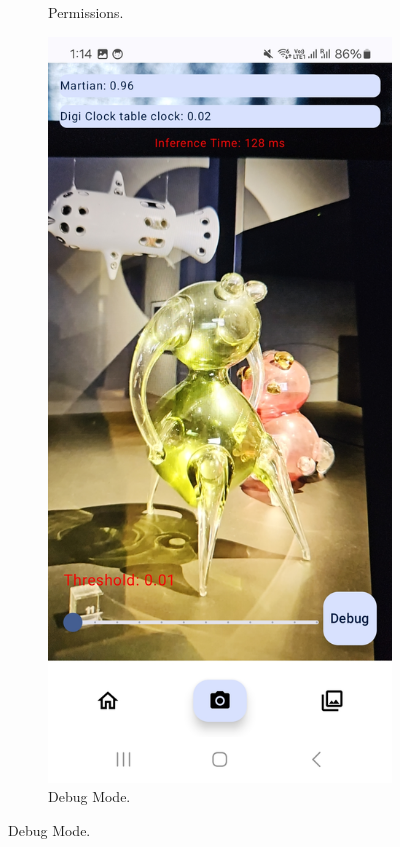 \begin{figure}[h]
\begin{subfigure}[b]{0.3\textwidth}
        \caption{Permissions.}
    \end{subfigure}
    \hfill
    \begin{subfigure}[b]{0.3\textwidth}
        \centering
        \includegraphics[width=\textwidth]{img/debug-mode.jpg}
        \caption{Debug Mode.}
    \end{subfigure}


\end{figure}
